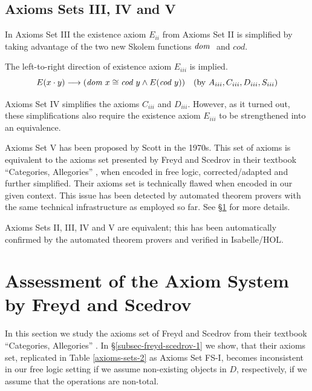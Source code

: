 \subsection{Axioms Sets III, IV and V} 
In Axioms Set III the existence  axiom  $E_{ii}$ from Axioms Set II  is simplified by taking advantage of 
  the two new Skolem functions ${\textit{dom \/}}$ and $cod$.

The left-to-right direction of existence axiom $E_{iii}$ is implied.
  $$E(x \cdot y) \longrightarrow (\textit{dom \/} x \cong \textit{cod \/} y \wedge E(\textit{cod \/} y)) \quad  
    (\text{by } A_{iii}, C_{iii}, D_{iii}, S_{iii})$$


Axioms Set IV simplifies the axioms $C_{iii}$ and  $D_{iii}$. However, as it turned 
 out, these simplifications also require the existence axiom $E_{iii}$ to be strengthened into
 an equivalence.


Axioms Set V has been proposed by Scott \cite{Scott79} in the 1970s. 
This set of axioms is equivalent to the axioms set presented by Freyd
and Scedrov in their textbook ``Categories, Allegories''
\cite{FreydScedrov90}, when encoded in free logic, corrected/adapted
and further simplified.  Their axioms set is technically flawed when
encoded in our given context. This issue has been detected by
automated theorem provers with the same technical infrastructure as
employed so far. See \S\ref{sec-freyd-scedrov} for more
details. 

 Axioms Sets II, III, IV and V are equivalent; this has been
 automatically 
 confirmed by the automated theorem provers and verified in
 Isabelle/HOL.

 \section{Assessment of the Axiom System by Freyd and
   Scedrov} \label{sec-freyd-scedrov} In this section we study the
 axioms set of Freyd and Scedrov from their textbook ``Categories,
 Allegories'' \cite{FreydScedrov90}.  In \S\ref{subsec-freyd-scedrov-1} we show, that their axioms set,
 replicated in Table \ref{axioms-sets-2} as Axioms Set FS-I, becomes
 inconsistent in our free logic setting if we assume non-existing
 objects in $D$, respectively, if we assume that the operations
 are non-total.



